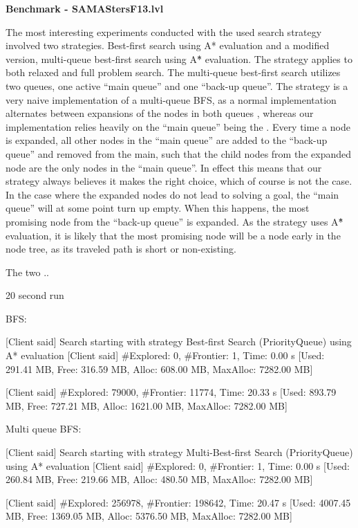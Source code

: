 \textbf{Benchmark - SAMAStersF13.lvl}


The most interesting experiments conducted with the used search strategy involved two strategies. Best-first search using A* evaluation and a modified version, multi-queue best-first search using A\^{*} evaluation. The strategy applies to both relaxed and full problem search. 
The multi-queue best-first search utilizes two queues, one active ``main queue'' and one ``back-up queue''. The strategy is a very naive implementation of a multi-queue BFS, as a normal implementation alternates between expansions of the nodes in both queues \cite{hector2013a}, whereas our implementation relies heavily on the ``main queue'' being the . Every time a node is expanded, all other nodes in the ``main queue'' are added to the ``back-up queue'' and removed from the main, such that the child nodes from the expanded node are the only nodes in the ``main queue''. In effect this means that our strategy always believes it makes the right choice, which of course is not the case. In the case where the expanded nodes do not lead to solving a goal, the ``main queue'' will at some point turn up empty. When this happens, the most promising node from the ``back-up queue'' is expanded. As the strategy uses A\^{*} evaluation, it is likely that the most promising node will be a node early in the node tree, as its traveled path is short or non-existing. 


The two .. 



20 second run 

BFS:

[Client said] Search starting with strategy Best-first Search (PriorityQueue) using A* evaluation
[Client said] #Explored:    0, #Frontier:   1, Time: 0.00 s     [Used: 291.41 MB, Free: 316.59 MB, Alloc: 608.00 MB, MaxAlloc: 7282.00 MB]

[Client said] #Explored: 79000, #Frontier: 11774, Time: 20.33 s     [Used: 893.79 MB, Free: 727.21 MB, Alloc: 1621.00 MB, MaxAlloc: 7282.00 MB]


Multi queue BFS:

[Client said] Search starting with strategy Multi-Best-first Search (PriorityQueue) using A* evaluation
[Client said] #Explored:    0, #Frontier:   1, Time: 0.00 s     [Used: 260.84 MB, Free: 219.66 MB, Alloc: 480.50 MB, MaxAlloc: 7282.00 MB]

[Client said] #Explored: 256978, #Frontier: 198642, Time: 20.47 s   [Used: 4007.45 MB, Free: 1369.05 MB, Alloc: 5376.50 MB, MaxAlloc: 7282.00 MB]


